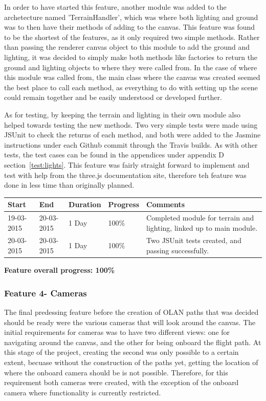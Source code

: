 In order to have started this feature, another module was added to the archetecture named 'TerrainHandler', which was where both lighting and ground was to then have their methods of adding to the canvas. This feature was found to be the shortest of the features, as it only required two simple methods. Rather than passing the renderer canvas object to this module to add the ground and lighting, it was decided to simply make both methods like factories to return the ground and lighting objects to where they were called from. In the case of where this module was called from, the main class where the canvas was created seemed the best place to call each method, as everything to do with setting up the scene could remain together and be easily understood or developed further.

As for testing, by keeping the terrain and lighting in their own module also helped towards testing the new methods. Two very simple tests were made using JSUnit to check the returns of each method, and both were added to the Jasmine instructions under each Github commit through the Travis builds. As with other tests, the test cases can be found in the appendices under appendix D section~\ref{test:lights}. This feature was fairly straight forward to implement and test with help from the three.js documentation site, therefore teh feature was done in less time than originally planned.

\begin{table}[h]
\begin{tabular}{|l|l|l|l|p{7cm}|}
\hline
\textbf{Start} & \textbf{End} & \textbf{Duration} & \textbf{Progress} & \textbf{Comments}                                                                                                     \\ \hline
19-03-2015     & 20-03-2015   & 1 Day            & 100\%             &  Completed module for terrain and lighting, linked up to main module.\\ \hline
20-03-2015     & 20-03-2015   & 1 Day            & 100\%             &  Two JSUnit tests created, and passing successfully.\\ \hline
\end{tabular}
\end{table}

\textbf{Feature overall progress: 100\%}

\subsubsection{Feature 4- Cameras}
The final predessing feature before the creation of OLAN paths that was decided should be ready were the various cameras that will look around the canvas. The initial requirements for cameras was to have two different views: one for navigating around the canvas, and the other for being onboard the flight path. At this stage of the project, creating the second was only possible to a certain extent, becuase without the construction of the paths yet, getting the location of where the onboard camera should be is not possible. Therefore, for this requirement both cameras were created, with the exception of the onboard camera where functionality is currently restricted. 

